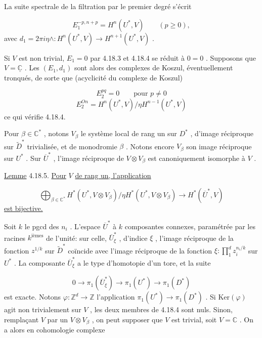 La suite spectrale de la filtration par le premier degré s'écrit

\begin{equation*}
E_1^{-p,n+p} = H^n(U^*, V) \qquad (p \geqslant 0) ,
\end{equation*}
avec $d_1 = 2\pi i \eta \wedge : H^n(U^*, V) \longrightarrow H^{n+1}(U^*, V)$ .

Si $V$ est non trivial, $E_1 = 0$ par 4.18.3 et 4.18.4 se réduit à $0 = 0$ . Supposons que $V = \underline{\mathbb{C}}$ . Les $(E_1, d_1)$ sont alors des complexes de Koszul, éventuellement tronqués, de sorte que (acyclicité du complexe de Koszul)

\begin{equation*}
E_2^{pq} = 0 \qquad \text{pour } p \neq 0
\end{equation*}
\begin{equation*}
E_2^{On} = H^n(U^*, V)/\eta H^{n-1}(U^*, V)
\end{equation*}
ce qui vérifie 4.18.4.

Pour $\beta \in \mathbb{C}^*$ , notons $V_\beta$ le système local de rang un sur $D^*$ , d'image réciproque sur $\widetilde{D}^*$ trivialisée, et de monodromie $\beta$ . Notons encore $V_\beta$ son image réciproque sur $U^*$ . Sur $\overline{U}^*$ , l'image réciproque de $V \otimes V_\beta$ est canoniquement isomorphe à $V$ .

\underline{Lemme} 4.18.5. \underline{Pour} $V$ \underline{de rang un, l'application}

\begin{equation*}
\bigoplus_{\beta \in \mathbb{C}^*} H^*(U^*, V \otimes V_\beta)/\eta H^*(U^*, V \otimes V_\beta) \longrightarrow H^*(\overline{U}^*, V)
\end{equation*}
\underline{est bijective.}

Soit $k$ le pgcd des $n_i$ . L'espace $\overline{U}^*$ à $k$ composantes connexes, paramétrée par les racines $k^{\text{ièmes}}$ de l'unité: sur celle, $\overline{U}^*_\xi$ , d'indice $\xi$ , l'image réciproque de la fonction $z^{1/k}$ sur $\widetilde{D}^*$ coïncide avec l'image réciproque de la fonction $\xi : \prod_1^d z_i^{n_i/k}$ sur $U^*$ . La composante $\overline{U}^*_\xi$ a le type d'homotopie d'un tore, et la suite

\begin{equation*}
0 \longrightarrow \pi_1(\overline{U}^*_\xi) \longrightarrow \pi_1(U^*) \longrightarrow \pi_1(D^*)
\end{equation*}
est exacte. Notons $\varphi : \mathbb{Z}^d \to \mathbb{Z}$ l'application $\pi_1(U^*) \to \pi_1(D^*)$ . Si $\mathrm{Ker}(\varphi)$ agit non trivialement sur $V$ , les deux membres de 4.18.4 sont nuls. Sinon, remplaçant $V$ par un $V \otimes V_\beta$ , on peut supposer que $V$ est trivial, soit $V = \mathbb{C}$ . On a alors en cohomologie complexe

